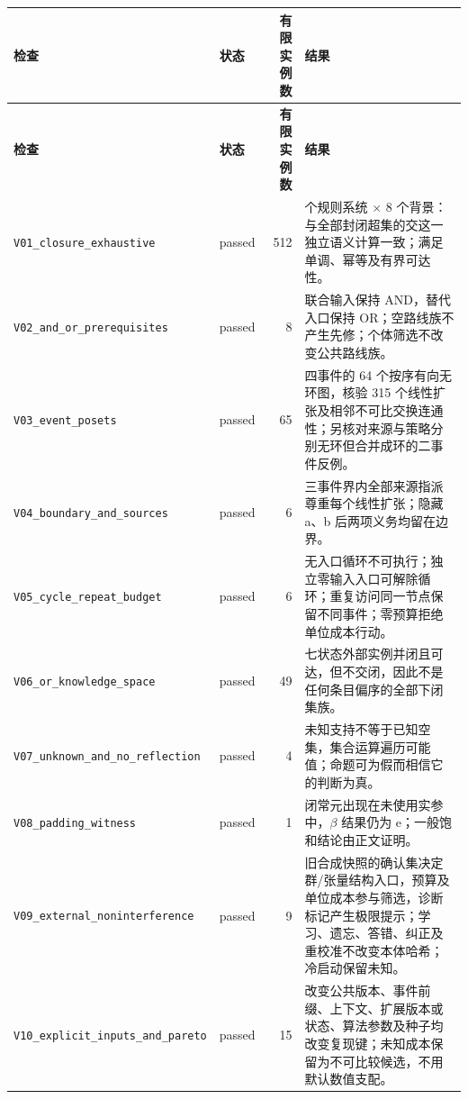 \documentclass[UTF8,a4paper,zihao=-4,fontset=windows,openany]{ctexbook}
\newcommand{\mcsbrk}{\penalty 200\relax}
\begin{document}
\begingroup\small\setlength{\tabcolsep}{4pt}
\begin{longtable}{>{\raggedright\arraybackslash}p{}>{\raggedright\arraybackslash}p{}r>{\raggedright\arraybackslash}p{}}
\toprule
\textbf{检查} & \textbf{状态} & \textbf{有限实例数} & \textbf{结果} \\
\midrule
\endfirsthead
\toprule
\textbf{检查} & \textbf{状态} & \textbf{有限实例数} & \textbf{结果} \\
\midrule
\endhead
\bottomrule
\endfoot
\bottomrule
\endlastfoot
\texttt{V01\mcsbrk\_closure\mcsbrk\_exhaustive} & passed & 512 & 64 个规则系统 \(\times\) 8 个背景：与全部封闭超集的交这一独立语义计算一致；满足单调、幂等及有界可达性。 \\
\texttt{V02\mcsbrk\_and\mcsbrk\_or\mcsbrk\_prerequisites} & passed & 8 & 联合输入保持 AND，替代入口保持 OR；空路线族不产生先修；个体筛选不改变公共路线族。 \\
\texttt{V03\mcsbrk\_event\mcsbrk\_posets} & passed & 65 & 四事件的 64 个按序有向无环图，核验 315 个线性扩张及相邻不可比交换连通性；另核对来源与策略分别无环但合并成环的二事件反例。 \\
\texttt{V04\mcsbrk\_boundary\mcsbrk\_and\mcsbrk\_sources} & passed & 6 & 三事件界内全部来源指派尊重每个线性扩张；隐藏 a、b 后两项义务均留在边界。 \\
\texttt{V05\mcsbrk\_cycle\mcsbrk\_repeat\mcsbrk\_budget} & passed & 6 & 无入口循环不可执行；独立零输入入口可解除循环；重复访问同一节点保留不同事件；零预算拒绝单位成本行动。 \\
\texttt{V06\mcsbrk\_or\mcsbrk\_knowledge\mcsbrk\_space} & passed & 49 & 七状态外部实例并闭且可达，但不交闭，因此不是任何条目偏序的全部下闭集族。 \\
\texttt{V07\mcsbrk\_unknown\mcsbrk\_and\mcsbrk\_no\mcsbrk\_reflection} & passed & 4 & 未知支持不等于已知空集，集合运算遍历可能值；命题可为假而相信它的判断为真。 \\
\texttt{V08\mcsbrk\_padding\mcsbrk\_witness} & passed & 1 & 闭常元出现在未使用实参中，\(\beta\) 结果仍为 e；一般饱和结论由正文证明。 \\
\texttt{V09\mcsbrk\_external\mcsbrk\_noninterference} & passed & 9 & 旧合成快照的确认集决定群/张量结构入口，预算及单位成本参与筛选，诊断标记产生极限提示；学习、遗忘、答错、纠正及重校准不改变本体哈希；冷启动保留未知。 \\
\texttt{V10\mcsbrk\_explicit\mcsbrk\_inputs\mcsbrk\_and\mcsbrk\_pareto} & passed & 15 & 改变公共版本、事件前缀、上下文、扩展版本或状态、算法参数及种子均改变复现键；未知成本保留为不可比较候选，不用默认数值支配。 \\

\end{longtable}
\end{document}
